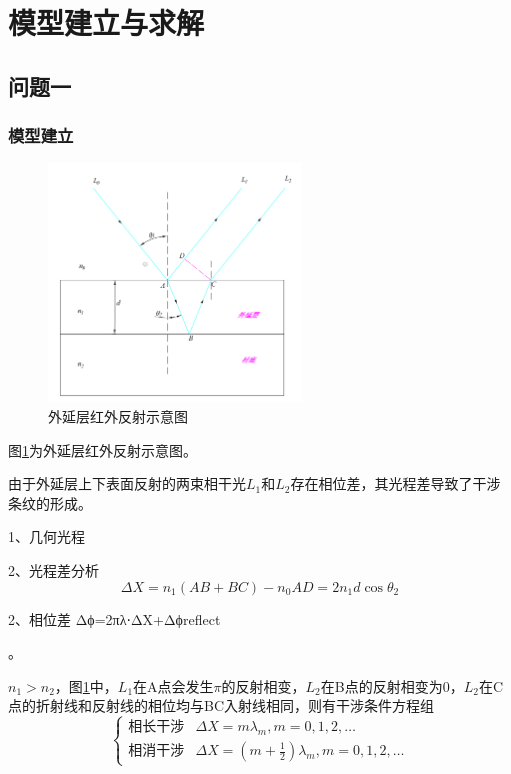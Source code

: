 \documentclass[withoutpreface,bwprint]{cumcmthesis} %
\begin{document}
\section{模型建立与求解}
\subsection{问题一}
\subsubsection{模型建立}
\begin{figure}[H]
    \centering
    \includegraphics[width=0.6\textwidth]{../figure/q1.png}
    \caption{外延层红外反射示意图}
    \label{fig:外延层红外反射示意图}
\end{figure}
图\ref{fig:外延层红外反射示意图}为外延层红外反射示意图。

由于外延层上下表面反射的两束相干光$L_1$和$L_2$存在相位差，其光程差导致了干涉条纹的形成。


1、几何光程


2、光程差分析
\begin{equation}
    \Delta X = n_1(AB + BC) - n_0AD = 2 n_1 d \cos \theta_2
\end{equation}

2、相位差
Δϕ=2πλ⋅ΔX+Δϕreflect


。


$n_1 > n_2$，图\ref{fig:外延层红外反射示意图}中，$L_1$在A点会发生$\pi$的反射相变，$L_2$在B点的反射相变为$0$，$L_2$在C点的折射线和反射线的相位均与BC入射线相同，则有干涉条件方程组
\begin{equation}
    \begin{cases}
        \text{相长干涉} & \Delta X = m\lambda_m,  m=0,1,2,… \\
        \text{相消干涉} & \Delta X = (m+\frac{1}{2}) \lambda_m,  m=0,1,2,… 
    \end{cases}
\end{equation}
\end{document}
